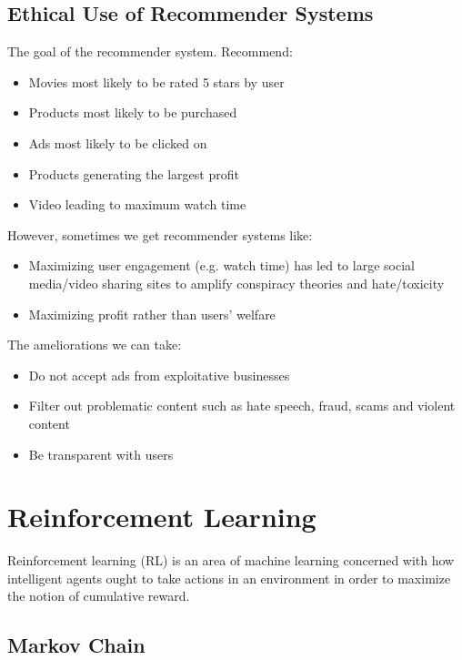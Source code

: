 \documentclass{article}
\begin{document}
\subsection{Ethical Use of Recommender Systems}

\noindent The goal of the recommender system. Recommend:

\begin{itemize}
    \item Movies most likely to be rated 5 stars by user
    \item Products most likely to be purchased
    \item Ads most likely to be clicked on
    \item Products generating the largest profit
    \item Video leading to maximum watch time
\end{itemize}

\noindent However, sometimes we get recommender systems like:

\begin{itemize}
    \item Maximizing user engagement (e.g. watch time) has led to large social media/video sharing sites to amplify conspiracy theories and hate/toxicity
    \item Maximizing profit rather than users’ welfare
\end{itemize}

\noindent The ameliorations we can take:

\begin{itemize}
    \item Do not accept ads from exploitative businesses
    \item Filter out problematic content such as hate speech, fraud, scams and violent content
    \item Be transparent with users
\end{itemize}

\section{Reinforcement Learning}

\noindent Reinforcement learning (RL) is an area of machine learning concerned with how intelligent agents ought to take actions in an environment in order to maximize the notion of cumulative reward.

\subsection{Markov Chain}
\end{document}
